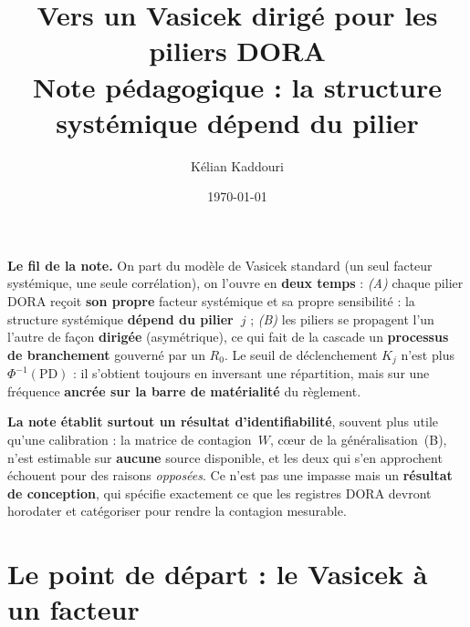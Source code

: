 \documentclass[11pt,a4paper]{article}
\title{\vspace{-1.2cm}\color{navy}\bfseries Vers un Vasicek dirigé pour les piliers DORA\\[2pt]
  \large Note pédagogique : la structure systémique dépend du pilier}
\author{Kélian Kaddouri}
\date{\today}
\begin{document}
\maketitle
\vspace{-0.6cm}

\begin{cle}
\textbf{Le fil de la note.} On part du modèle de Vasicek standard (un seul facteur
systémique, une seule corrélation), on l'ouvre en \textbf{deux temps} : \emph{(A)} chaque
pilier DORA reçoit \textbf{son propre} facteur systémique et sa propre sensibilité :
la structure systémique \textbf{dépend du pilier~$j$} ; \emph{(B)} les piliers se
propagent l'un l'autre de façon \textbf{dirigée} (asymétrique), ce qui fait de la cascade un
\textbf{processus de branchement} gouverné par un $R_0$. Le seuil de déclenchement $K_j$
n'est plus $\Phi^{-1}(\mathrm{PD})$ : il s'obtient toujours en inversant une répartition,
mais sur une fréquence \textbf{ancrée sur la barre de matérialité} du règlement.

\smallskip
\noindent\textbf{La note établit surtout un résultat d'identifiabilité}, souvent plus utile
qu'une calibration : la matrice de contagion~$W$, c\oe{}ur de la généralisation~(B), n'est estimable
sur \textbf{aucune} source disponible, et les deux qui s'en approchent échouent pour des raisons
\emph{opposées}. Ce n'est pas une impasse mais un \textbf{résultat de conception}, qui spécifie
exactement ce que les registres DORA devront horodater et catégoriser pour rendre la contagion
mesurable.
\end{cle}

\section{Le point de départ : le Vasicek à un facteur}
\end{document}
